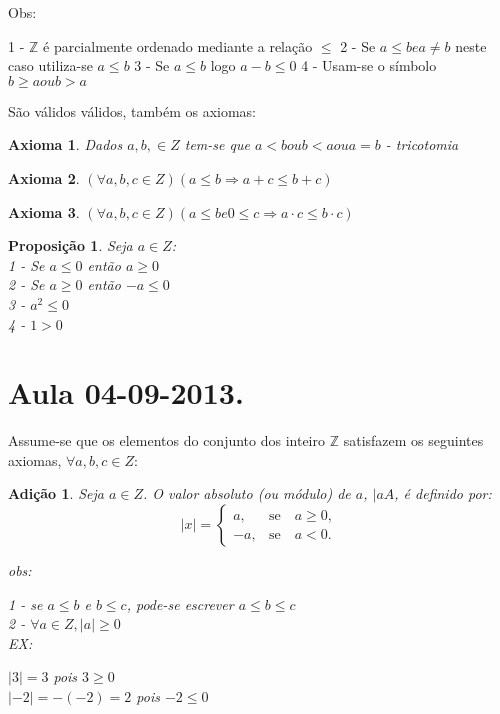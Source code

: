 \documentclass[a4paper,12pt]{article}
\newtheorem{add}{Adição}
\newtheorem{prop}{Proposição}
\newtheorem{ax}{Axioma}
\begin{document}
Obs:

1 - $\mathbb{Z}$ é parcialmente ordenado mediante a relação $\leq$
2 - Se $a \leq b e a \neq b$ neste caso utiliza-se $a \leq b$
3 - Se $a \leq b$ logo $a - b \leq 0$
4 - Usam-se o símbolo $b \geq a ou b > a$


São válidos válidos, também os axiomas:

\begin{ax}
  Dados $a, b, \in Z$ tem-se que $a < b ou b < a ou a = b$ - tricotomia
\end{ax}

\begin{ax}
  $(\forall a, b, c \in Z)(a \leq b \Longrightarrow a + c \leq b + c)$
\end{ax}
\begin{ax}
  $(\forall a, b, c \in Z)(a \leq b e 0 \leq c \Longrightarrow a \cdot c \leq b \cdot c)$
\end{ax}

\begin{prop} %
  Seja $a \in Z$:\\
  1 - Se $a \leq 0$ então $a \geq 0$\\
  2 - Se $a \geq 0$ então $-a \leq 0$\\
  3 - $a^2 \leq 0$\\
  4 - $1 > 0$\\
\end{prop}

\section{Aula 04-09-2013.}

Assume-se que os elementos do conjunto dos inteiro $\mathbb{Z}$ satisfazem os seguintes axiomas, $\forall a, b, c \in Z$:

\begin{add} %
  Seja $a \in Z$. O valor absoluto (ou módulo) de $a$, $|aA$, é definido por:\\
  $$
  |x|=\left\{
    \begin{array}{rc}
      a,&\mbox{se}\quad a\ge 0,\\
      -a, &\mbox{se}\quad a<0.
    \end{array}\right.
  $$

obs:

1 - se $a \leq b$ e $b \leq c$, pode-se escrever $a \leq b \leq c$\\
2 - $\forall a \in Z, |a| \ge 0$\\

EX:

$|3| = 3$ pois $3 \geq 0$\\
$|-2| = -(-2) = 2$ pois $-2 \leq 0$
\end{add}
\end{document}
